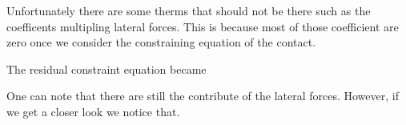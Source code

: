 \documentclass{article}
\begin{document}
\begin{maplegroup}
\begin{Maple Normal}{
Unfortunately there are some therms that should not be there such as the coefficents multipling lateral forces. This is because most of those coefficient are zero once we consider the constraining equation of the contact.}\end{Maple Normal}

\end{maplegroup}
\begin{maplegroup}
\begin{mapleinput}
\end{mapleinput}
\end{maplegroup}
\begin{maplegroup}
\begin{Maple Normal}{
The residual constraint equation became}\end{Maple Normal}

\end{maplegroup}
\begin{maplegroup}
\begin{mapleinput}
\end{mapleinput}
\mapleresult
\begin{maplelatex}
\end{maplelatex}
\end{maplegroup}
\begin{maplegroup}
\begin{Maple Normal}{
One can note that there are still the contribute of the lateral forces. However, if we get a closer look we notice that.}\end{Maple Normal}

\end{maplegroup}
\begin{maplegroup}
\begin{mapleinput}
\end{mapleinput}
\mapleresult
\begin{maplelatex}
\end{maplelatex}
\end{maplegroup}
\end{document}
